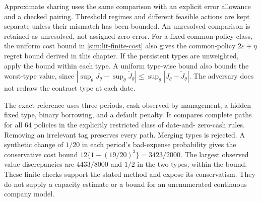 Approximate sharing uses the same comparison with an explicit error allowance
and a checked pairing. Threshold regimes and different feasible actions are
kept separate unless their mismatch has been bounded. An unresolved comparison
is retained as unresolved, not assigned zero error. For a fixed common policy
class, the uniform cost bound in \eqref{sim:lit-finite-cost} also gives the common-policy
$2\varepsilon+\eta$ regret bound derived in this chapter. If the persistent types are unweighted,
apply the bound within each type. A uniform type-wise bound also bounds the
worst-type value, since
$|\sup_\theta J_\theta-\sup_\theta\widetilde J_\theta|
\le\sup_\theta|J_\theta-\widetilde J_\theta|$.
The adversary does not redraw the contract type at each date.

The exact reference uses three periods, cash observed by management, a hidden
fixed type, binary borrowing, and a default penalty. It compares complete
paths for all 64 policies in the explicitly restricted class of date-and-
zero-cash rules. Removing an irrelevant tag preserves every path. Merging
types is rejected. A synthetic change of $1/20$ in each period's bad-expense
probability gives the conservative cost bound
$12\{1-(19/20)^3\}=3423/2000$. The largest observed value discrepancies are
$4433/8000$ and $1/2$ in the two types, within the bound. These finite checks
support the stated method and expose its conservatism. They do not supply a
capacity estimate or a bound for an unenumerated continuous company model.
